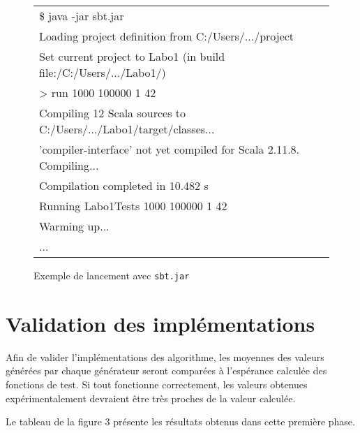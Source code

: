 \documentclass[a4paper,11pt]{article}
\begin{document}
\begin{figure}[h]
\begin{tabular}{l}
	\hline
	{\ttfamily \$ java -jar sbt.jar}\\
	{\ttfamily [info] Loading project definition from C:/Users/.../project}\\
	{\ttfamily [info] Set current project to Labo1 (in build file:/C:/Users/.../Labo1/)}\\
	{\ttfamily > run 1000 100000 1 42}\\
	{\ttfamily [info] Compiling 12 Scala sources to C:/Users/.../Labo1/target/classes...}\\
	{\ttfamily [info] 'compiler-interface' not yet compiled for Scala 2.11.8. Compiling...}\\
	{\ttfamily [info]   Compilation completed in 10.482 s}\\
	{\ttfamily [info] Running Labo1Tests 1000 100000 1 42}\\
	{\ttfamily Warming up...}\\
	{\ttfamily ...}\\
	\hline
\end{tabular}
\caption{Exemple de lancement avec \texttt{sbt.jar}}
\end{figure}

\section{Validation des implémentations}

Afin de valider l'implémentations des algorithme, les moyennes des valeurs générées par chaque générateur seront comparées à l'espérance calculée des fonctions de test. Si tout fonctionne correctement, les valeurs obtenues expérimentalement devraient être très proches de la valeur calculée.

Le tableau de la figure 3 présente les résultats obtenus dans cette première phase.
\end{document}
